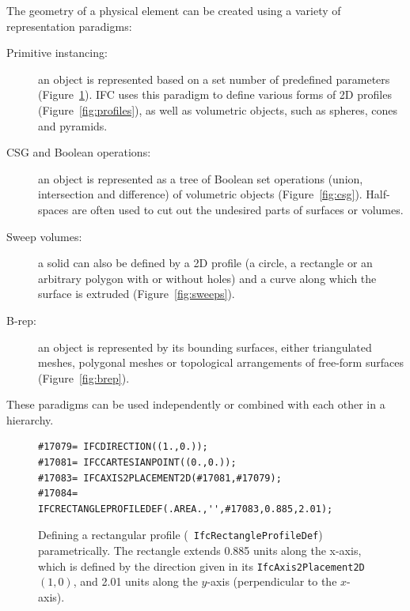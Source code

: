 The geometry of a physical element can be created using a variety of representation paradigms:
\begin{description}
  \item[Primitive instancing:] an object is represented based on a set number of predefined parameters (Figure~\ref{fig:parametric}).
  IFC uses this paradigm to define various forms of 2D profiles (Figure~\ref{fig:profiles}), as well as volumetric objects, such as spheres, cones and pyramids.
  \item[CSG and Boolean operations:] an object is represented as a tree of Boolean set operations (union, intersection and difference) of volumetric objects (Figure~\ref{fig:csg}).
  Half-spaces are often used to cut out the undesired parts of surfaces or volumes.
  \item[Sweep volumes:] a solid can also be defined by a 2D profile (a circle, a rectangle or an arbitrary polygon with or without holes) and a curve along which the surface is extruded (Figure~\ref{fig:sweeps}).
  \item[B-rep:] an object is represented by its bounding surfaces, either triangulated meshes, polygonal meshes or topological arrangements of free-form surfaces (Figure~\ref{fig:brep}).
\end{description}
These paradigms can be used independently or combined with each other in a hierarchy.

\begin{figure}
\begin{lstlisting}[frame=single]
#17079= IFCDIRECTION((1.,0.));
#17081= IFCCARTESIANPOINT((0.,0.));
#17083= IFCAXIS2PLACEMENT2D(#17081,#17079);
#17084= IFCRECTANGLEPROFILEDEF(.AREA.,'',#17083,0.885,2.01);
\end{lstlisting}
\caption{Defining a rectangular profile (\ie\ \texttt{IfcRectangleProfileDef}) parametrically.
The rectangle extends 0.885 units along the x-axis, which is defined by the direction given in its \texttt{IfcAxis2Placement2D} \((1,0)\), and 2.01 units along the \(y\)-axis (perpendicular to the \(x\)-axis).}%
\label{fig:parametric}
\end{figure}

